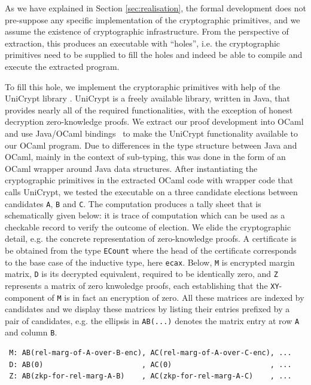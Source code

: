 As we have explained in Section \ref{sec:realisation}, the formal
development does not pre-suppose any specific implementation of the
cryptographic primitives, and we assume the existence of
cryptographic infrastructure. From the perspective of extraction,
this produces an executable with ``holes'', i.e. the cryptographic
primitives need to be supplied to fill the holes and indeed be able
to compile and execute the extracted program.  

To fill this hole, we implement the cryptoraphic primitives with
help of the UniCrypt library \citep{LocherH14}.
UniCrypt is a freely available library, written in Java,  that provides nearly all of
the required functionalities, with the exception of honest decryption
zero-knowledge proofs.  We extract our proof development into OCaml
and use Java/OCaml bindings~\citep{OCamlJava} to make the UniCrypt
functionality available to our OCaml program. Due to differences
in the type structure between Java and OCaml, mainly in the context
of sub-typing, this was done in the form of an OCaml wrapper around
Java data structures.  After instantiating the  
 cryptographic primitives in the extracted OCaml code with wrapper
 code that calls UniCrypt,
 we tested the executable on a three candidate elections between
 candidates \texttt{A}, \texttt{B} and \texttt{C}.
 The computation produces a tally sheet that is schematically given
 below:
 it is trace of computation which can be used as a checkable record to verify
 the outcome of election. We elide the cryptographic detail, e.g.
 the concrete representation of zero-knowledge proofs.
 A certificate
 is be obtained from the type \texttt{ECount} where the head
 of the certificate corresponds to the base case of the inductive
 type, here \texttt{ecax}. Below, \texttt{M} is encrypted margin
 matrix, \texttt{D} is its decrypted equivalent, required to be
 identically zero, and \texttt{Z} represents a matrix of zero
 knwoledge proofs, each establishing that the \texttt{XY}-component
 of \texttt{M} is in fact an encryption of zero. All these matrices
 are indexed by candidates and we display these matrices by listing
 their entries prefixed by a pair of candidates, e.g. the ellipsis
 in \texttt{AB(...)} denotes the matrix entry at row \texttt{A} and
 column \texttt{B}.

 {\small
 \begin{verbatim}
 M: AB(rel-marg-of-A-over-B-enc), AC(rel-marg-of-A-over-C-enc), ... 
 D: AB(0)                       , AC(0)                       , ...
 Z: AB(zkp-for-rel-marg-A-B)    , AC(zkp-for-rel-marg-A-C)    , ...
 \end{verbatim}}
 
